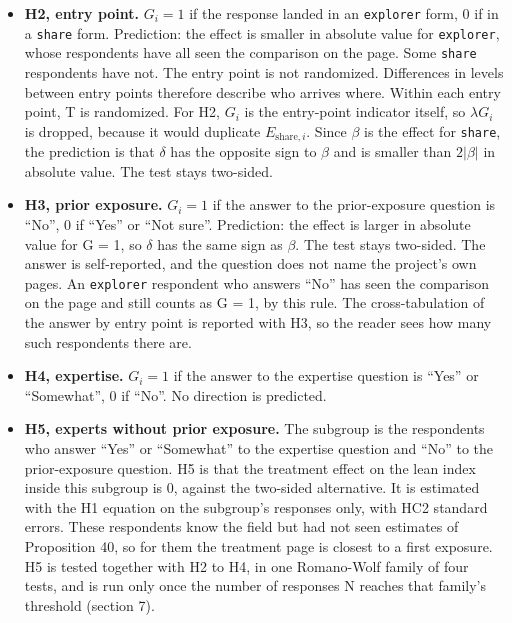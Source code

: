 \begin{itemize}
\tightlist
\item
  \textbf{H2, entry point.} \(G_i = 1\) if the response landed in an \texttt{explorer} form, 0 if in a \texttt{share}
  form. Prediction: the effect is smaller in absolute value for \texttt{explorer}, whose respondents have
  all seen the comparison on the page. Some \texttt{share} respondents have not. The entry point is not
  randomized. Differences in levels between entry points therefore describe who arrives where.
  Within each entry point, T is randomized. For H2, \(G_i\) is the entry-point indicator itself, so
  \(\lambda G_i\) is dropped, because it would duplicate \(E_{\mathrm{share},i}\). Since \(\beta\) is the
  effect for \texttt{share}, the prediction is that \(\delta\) has the opposite sign to \(\beta\) and is smaller
  than \(2|\beta|\) in absolute value. The test stays two-sided.
\item
  \textbf{H3, prior exposure.} \(G_i = 1\) if the answer to the prior-exposure question is ``No'', 0 if ``Yes'' or
  ``Not sure''. Prediction: the effect is larger in absolute value for G = 1, so \(\delta\) has the same
  sign as \(\beta\). The test stays two-sided. The answer is self-reported, and the question does not
  name the project's own pages. An \texttt{explorer} respondent who answers ``No'' has seen the comparison
  on the page and still counts as G = 1, by this rule. The cross-tabulation of the answer by entry
  point is reported with H3, so the reader sees how many such respondents there are.
\item
  \textbf{H4, expertise.} \(G_i = 1\) if the answer to the expertise question is ``Yes'' or ``Somewhat'', 0 if
  ``No''. No direction is predicted.
\item
  \textbf{H5, experts without prior exposure.} The subgroup is the respondents who answer ``Yes'' or
  ``Somewhat'' to the expertise question and ``No'' to the prior-exposure question. H5 is that the
  treatment effect on the lean index inside this subgroup is 0, against the two-sided alternative.
  It is estimated with the H1 equation on the subgroup's responses only, with HC2 standard errors.
  These respondents know the field but had not seen estimates of Proposition 40, so for them the
  treatment page is closest to a first exposure. H5 is tested together with H2 to H4, in one
  Romano-Wolf family of four tests, and is run only once the number of responses N reaches that family's threshold
  (section 7).
\end{itemize}

